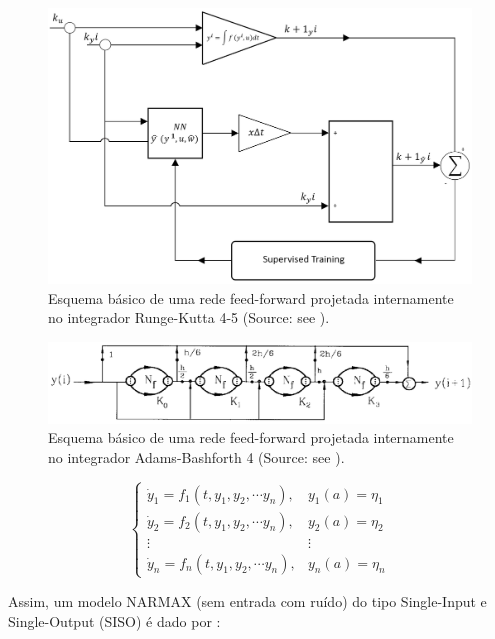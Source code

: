 \documentclass[journal,article,submit,pdftex,moreauthors]{Definitions/mdpi}
\begin{document}
\begin{figure}[htb]
\centering
\includegraphics[scale=0.24]{Definitions/figure4.png}
\caption{Esquema básico de uma rede feed-forward projetada internamente no integrador Runge-Kutta 4-5 (Source: see \cite{ref11}).}
\label{fig4}
\end{figure}

\begin{figure}[htb]
\centering
\includegraphics[scale=0.55]{Definitions/figure5.png}
\caption{Esquema básico de uma rede feed-forward projetada internamente no integrador Adams-Bashforth 4 (Source: see \cite{ref12}).}
\label{fig5}
\end{figure}

\begin{equation}
	\left\{\begin{matrix}
		\dot{y}_1= f_1(t, y_1, y_2, \cdots y_n), & y_1(a)=\eta _1 \\
 		\dot{y}_2= f_2(t, y_1, y_2, \cdots y_n), & y_2(a)=\eta _2 \\
 		\vdots & \vdots \\
 		\dot{y}_n= f_n(t, y_1, y_2, \cdots y_n), & y_n(a)=\eta _n 
	\end{matrix}\right.	
	\label{eq:1}
 \end{equation}

Assim, um modelo NARMAX (sem entrada com ruído) do tipo Single-Input e Single-Output (SISO) é dado por \cite{ref5, ref6}:
\end{document}

